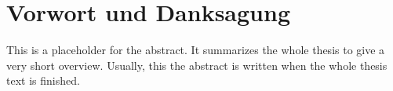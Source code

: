 \chapter*{Vorwort und Danksagung}
\label{cha:Vorwort}


This is a placeholder for the abstract. It summarizes the whole thesis
to give a very short overview. Usually, this the abstract is written
when the whole thesis text is finished.

